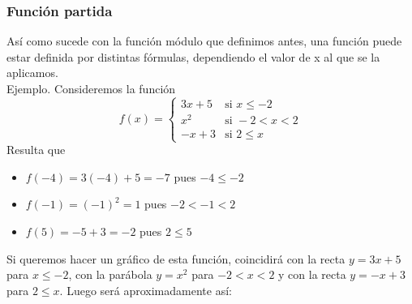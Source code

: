 \documentclass[../Teoría.root.tex]{subfiles}
\begin{document}
        \subsubsection{Función partida}
        Así como sucede con la función módulo que definimos antes, una función puede estar definida por distintas fórmulas, dependiendo el valor de x al que se la aplicamos.\\
        Ejemplo. Consideremos la función
        \[f(x)=
            \begin{cases}
                3x+5 & \text{si }x\leq -2\\
                x^2 & \text{si }-2<x<2\\
                -x+3 & \text{si }2\leq x
            \end{cases}
        \]
        Resulta que
        \begin{itemize}
            \item \(f(-4)=3(-4)+5=-7\) pues \(-4\leq -2\)
            \item \(f(-1)=(-1)^2=1\) pues \(-2< -1<2\)
            \item \(f(5)=-5+3=-2\) pues \(2\leq 5\)
        \end{itemize}
        Si queremos hacer un gráfico de esta función, coincidirá con la recta \(y =3x+5\) para \(x\leq−2\), con la parábola \(y=x^2\) para \(−2<x<2\) y con la recta \(y=−x+3\) para \(2\leq x\). Luego será aproximadamente así:
        \begin{center}
        \end{center}
\end{document}
